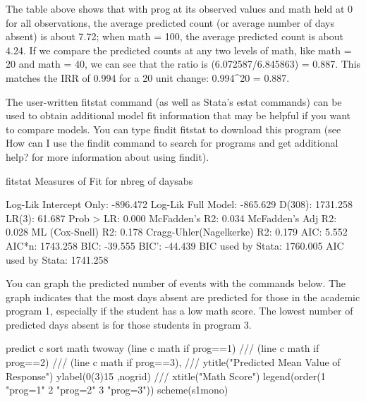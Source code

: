The table above shows that with prog at its observed values and math held at 0 for all observations, the average predicted count (or average number of days absent) is about 7.72; when math = 100, the average predicted count is about 4.24. If we compare the predicted counts at any two levels of math, like math = 20 and math = 40, we can see that the ratio is (6.072587/6.845863) = 0.887. This matches the IRR of 0.994 for a 20 unit change: 0.994^20 = 0.887.

The user-written fitstat command (as well as Stata's estat commands) can be used to obtain additional model fit information that may be helpful if you want to compare models.  You can type findit fitstat to download this program (see How can I use the findit command to search for programs and get additional help? for more information about using findit).

fitstat
Measures of Fit for nbreg of daysabs

Log-Lik Intercept Only:       -896.472   Log-Lik Full Model:           -865.629
D(308):                       1731.258   LR(3):                          61.687
Prob > LR:                       0.000
McFadden's R2:                   0.034   McFadden's Adj R2:               0.028
ML (Cox-Snell) R2:               0.178   Cragg-Uhler(Nagelkerke) R2:      0.179
AIC:                             5.552   AIC*n:                        1743.258
BIC:                           -39.555   BIC':                          -44.439
BIC used by Stata:            1760.005   AIC used by Stata:            1741.258

You can graph the predicted number of events with the commands below.  The graph indicates that the most days absent are predicted for those in the academic program 1, especially if the student has a low math score.  The lowest number of predicted days absent is for those students in program 3.

predict c
sort math
twoway (line c math if prog==1) ///
(line c math if prog==2) ///
(line c math if prog==3), ///
ytitle("Predicted Mean Value of Response") ylabel(0(3)15 ,nogrid) ///
xtitle("Math Score") legend(order(1 "prog=1" 2 "prog=2" 3 "prog=3")) scheme(s1mono)



